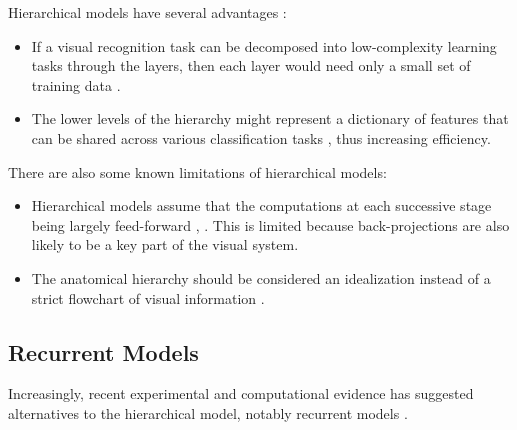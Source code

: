 \par Hierarchical models have several advantages :
\begin{itemize}
    \item If a visual recognition task can be decomposed into low-complexity learning tasks through the layers, then each layer would need only a small set of training data \cite{poggio2003mathematics}.
    \item The lower levels of the hierarchy might represent a dictionary of features that can be shared across various classification tasks \cite{geman1999hierarchy}, thus increasing efficiency.
\end{itemize}

\par There are also some known limitations of hierarchical models:
\begin{itemize}
    \item Hierarchical models assume that the computations at each successive stage being largely feed-forward \cite{riesenhuber1999hierarchical}, \cite{dicarlo2012does}. This is limited because back-projections are also likely to be a key part of the visual system. 
    \item The anatomical hierarchy should be considered an idealization instead of a strict flowchart of visual information \cite{hegde2007reappraising}. 
\end{itemize}

\subsection{Recurrent Models}
\label{neuro-recurrent}
\par Increasingly, recent experimental and computational evidence has suggested  alternatives to the hierarchical model, notably recurrent models \cite{martinez_complex_2003}.


